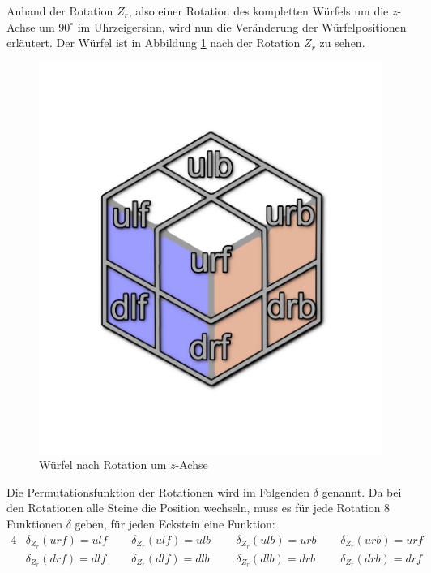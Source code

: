 \documentclass[12pt,a4paper, usenames, dvipsnames]{article}
\theoremstyle{mystyle}
\theoremstyle{definition}
\begin{document}
Anhand der Rotation $Z_r$, also einer Rotation des kompletten Würfels um die $z$-Achse um $90^\circ$ im Uhrzeigersinn, wird nun die Veränderung der Würfelpositionen erläutert. Der Würfel ist in Abbildung \ref{Abbildung_WürfelNachRotationUmZAchse} nach der Rotation $Z_r$ zu sehen.
\begin{figure}[H]
\centering
\includegraphics[scale=0.13]{auf_ulf.png}
\caption{Würfel nach Rotation um $z$-Achse}
\label{Abbildung_WürfelNachRotationUmZAchse}
\end{figure}
Die Permutationsfunktion der Rotationen wird im Folgenden $\delta$ genannt. Da bei den Rotationen alle Steine die Position wechseln, muss es für jede Rotation 8 Funktionen $\delta$ geben, für jeden Eckstein eine Funktion:
\begin{alignat*}{4}
& \delta_{Z_r}(\textit{urf}) = \textit{ulf} \ \ \ \ \ \ & \delta_{Z_r}(\textit{ulf}) = \textit{ulb} \ \ \ \ \ \ & \delta_{Z_r}(\textit{ulb}) = \textit{urb} \ \ \ \ \ \ & \delta_{Z_r}(\textit{urb}) = \textit{urf} \\
& \delta_{Z_r}(\textit{drf}) = \textit{dlf} \ \ \ \ \ \ & \delta_{Z_r}(\textit{dlf}) = \textit{dlb} \ \ \ \ \ \ \ & \delta_{Z_r}(\textit{dlb}) = \textit{drb} \ \ \ \ \ \ & \delta_{Z_r}(\textit{drb}) = \textit{drf}
\end{alignat*}
\end{document}
